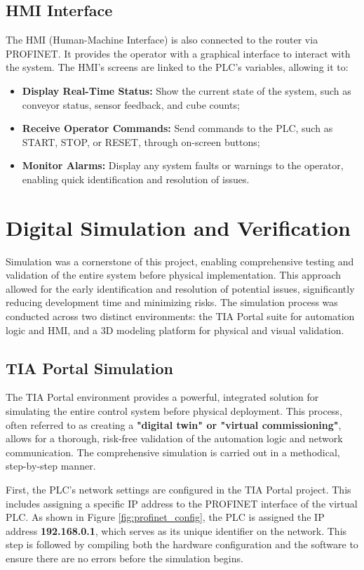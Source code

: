 \subsection{HMI Interface}
The HMI (Human-Machine Interface) is also connected to the router via PROFINET. It provides the operator with a graphical interface to interact with the system. The HMI's screens are linked to the PLC's variables, allowing it to:
\begin{itemize}
    \item \textbf{Display Real-Time Status:} Show the current state of the system, such as conveyor status, sensor feedback, and cube counts;
    \item \textbf{Receive Operator Commands:} Send commands to the PLC, such as START, STOP, or RESET, through on-screen buttons;
    \item \textbf{Monitor Alarms:} Display any system faults or warnings to the operator, enabling quick identification and resolution of issues.
\end{itemize}

\section{Digital Simulation and Verification}
Simulation was a cornerstone of this project, enabling comprehensive testing and validation of the entire system before physical implementation. This approach allowed for the early identification and resolution of potential issues, significantly reducing development time and minimizing risks. The simulation process was conducted across two distinct environments: the TIA Portal suite for automation logic and HMI, and a 3D modeling platform for physical and visual validation.

\subsection{TIA Portal Simulation}
The TIA Portal environment provides a powerful, integrated solution for simulating the entire control system before physical deployment. This process, often referred to as creating a \textbf{"digital twin" or "virtual commissioning"}, allows for a thorough, risk-free validation of the automation logic and network communication. The comprehensive simulation is carried out in a methodical, step-by-step manner.

First, the PLC's network settings are configured in the TIA Portal project. This includes assigning a specific IP address to the PROFINET interface of the virtual PLC. As shown in Figure \ref{fig:profinet_config}, the PLC is assigned the IP address \textbf{192.168.0.1}, which serves as its unique identifier on the network. This step is followed by compiling both the hardware configuration and the software to ensure there are no errors before the simulation begins.



